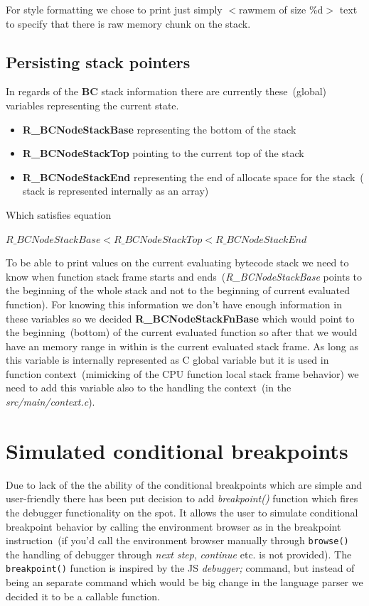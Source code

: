 \documentclass[thesis=M,english]{FITthesis}[2018/10/20]
\newcommand{\code}[1]{\texttt{#1}}
\begin{document}
For style formatting we chose to print just simply $<$rawmem of size \%d$>$ text to specify that there is raw memory chunk on the stack.

\subsection{Persisting stack pointers}\label{persisting-stack-pointers}

In regards of the \textbf{BC} stack information there are currently these~(global) variables representing the current state.
 
\begin{itemize}
\item \textbf{R{\_}BCNodeStackBase} representing the bottom of the stack
	\item \textbf{R{\_}BCNodeStackTop} pointing to the current top of the stack
	\item \textbf{R{\_}BCNodeStackEnd} representing the end of allocate space for the stack~( stack is represented internally as an array)
\end{itemize}

Which satisfies equation 

$R{\_}BCNodeStackBase < R{\_}BCNodeStackTop < R{\_}BCNodeStackEnd$

To be able to print values on the current evaluating bytecode stack we need to know when function stack frame starts and ends~(\textit{R{\_}BCNodeStackBase} points to the beginning of the whole stack and not to the beginning of current evaluated function). For knowing this information we don't have enough information in these variables so we decided \textbf{R{\_}BCNodeStackFnBase} which would point to the beginning~(bottom) of the current evaluated function so after that we would have an memory range in within is the current evaluated stack frame. As long as this variable is internally represented as C global variable but it is used in function context~(mimicking of the CPU function local stack frame behavior) we need to add this variable also to the handling the context~(in the \textit{src/main/context.c}).

\section{Simulated conditional breakpoints}\label{conditional-breakpoints}

Due to lack of the the ability of the conditional breakpoints which are simple and user-friendly there has been put decision to add \textit{breakpoint()} function which fires the debugger functionality on the spot. It allows the user to simulate conditional breakpoint behavior by calling the environment browser as in the breakpoint instruction~(if you'd call the environment browser manually through \code{browse()} the handling of debugger through \textit{next step}, \textit{continue} etc. is not provided). The \code{breakpoint()} function is inspired by the JS \textit{debugger;} command, but instead of being an separate command which would be big change in the language parser we decided it to be a callable function.
\end{document}
